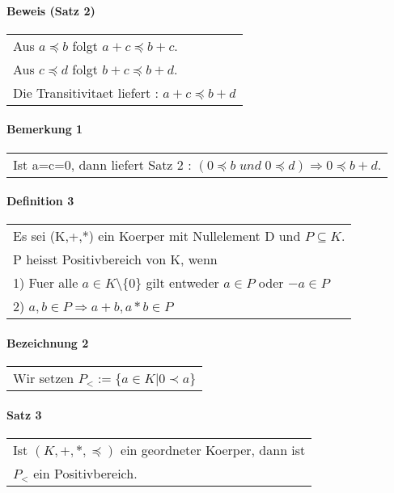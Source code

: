 \documentclass{scrartcl}
\begin{document}
\paragraph{Beweis (Satz 2)}
\begin{tabbing}
\begin{tabular}{l}
Aus $ a\preceq b $ folgt $ a+c \preceq b+c $.\\
Aus $ c\preceq d $ folgt $ b+c \preceq b+d $.\\
Die Transitivitaet liefert : $ a+c \preceq b+d $
\end{tabular}
\end{tabbing}

\paragraph{Bemerkung 1}
\begin{tabbing}
\begin{tabular}{l}
Ist a=c=0, dann liefert Satz 2 : 
$ (0 \preceq b\; und\; 0 \preceq d) \Rightarrow 0 \preceq b+d. $
\end{tabular}
\end{tabbing}

\paragraph{Definition 3}
\begin{tabbing}
\begin{tabular}{l}
Es sei (K,+,*) ein Koerper mit Nullelement D und $P\subseteq K$. \\
P heisst Positivbereich von K, wenn\\
1) Fuer alle $a\in K\setminus\{ 0\}$ gilt entweder $a\in P$ oder $-a\in P$\\
2) $a,b\in P \Rightarrow a+b, a*b\in P$
\end{tabular}
\end{tabbing}

\paragraph{Bezeichnung 2}
\begin{tabbing}
\begin{tabular}{l}
Wir setzen $P_< := \{ a\in K| 0 \prec a\}$ 
\end{tabular}
\end{tabbing}

\paragraph{Satz 3}
\begin{tabbing}
\begin{tabular}{l}
Ist $(K,+,*,\preceq)$ ein geordneter Koerper, dann ist \\
$P_<$ ein Positivbereich.
\end{tabular}
\end{tabbing}
\end{document}
